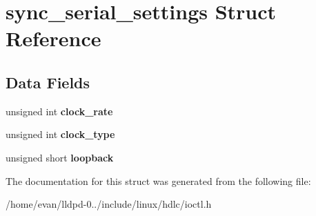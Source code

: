 \section{sync\-\_\-serial\-\_\-settings \-Struct \-Reference}
\label{structsync__serial__settings}
\subsection*{\-Data \-Fields}
\begin{DoxyCompactItemize}
\item 
unsigned int {\bfseries clock\-\_\-rate}\label{structsync__serial__settings_a133e878278d4fa925a658019fd555e50}

\item 
unsigned int {\bfseries clock\-\_\-type}\label{structsync__serial__settings_a136005d437419001b68c66d2f9bb3e16}

\item 
unsigned short {\bfseries loopback}\label{structsync__serial__settings_ae0eece6539174750cf895270e4cfdc72}

\end{DoxyCompactItemize}


\-The documentation for this struct was generated from the following file\-:\begin{DoxyCompactItemize}
\item 
/home/evan/lldpd-\/0../include/linux/hdlc/ioctl.\-h\end{DoxyCompactItemize}
